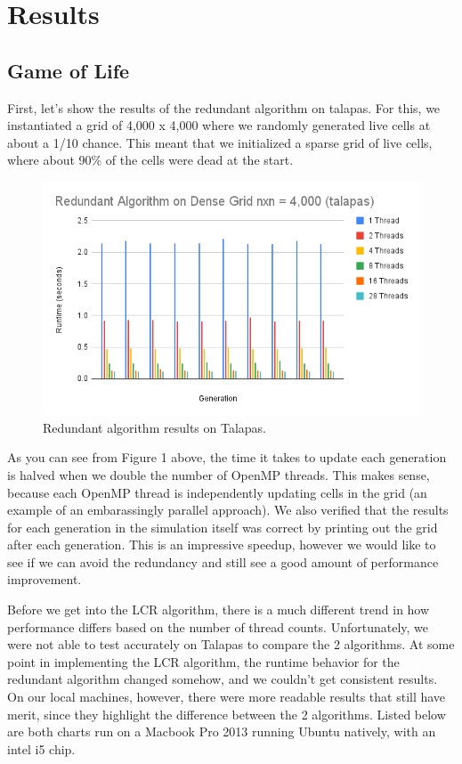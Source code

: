 \documentclass[12pt]{article}
\begin{document}
\section{Results}

\subsection{Game of Life}
First, let's show the results of the redundant algorithm on talapas. For this, we instantiated a grid of 4,000 x 4,000 where we randomly generated live cells at about a 1/10 chance. This meant that we initialized a sparse grid of live cells, where about 90\% of the cells were dead at the start.

\begin{figure}[ht]
\centering
\includegraphics[width=\linewidth]{redundant_4000.PNG}
\caption{\label{fig:chart_1}Redundant algorithm results on Talapas.}
\end{figure}

As you can see from Figure 1 above, the time it takes to update each generation is halved when we double the number of OpenMP threads. This makes sense, because each OpenMP thread is independently updating cells in the grid (an example of an embarassingly parallel approach). We also verified that the results for each generation in the simulation itself was correct by printing out the grid after each generation. This is an impressive speedup, however we would like to see if we can avoid the redundancy and still see a good amount of performance improvement.

Before we get into the LCR algorithm, there is a much different trend in how performance differs based on the number of thread counts. Unfortunately, we were not able to test accurately on Talapas to compare the 2 algorithms. At some point in implementing the LCR algorithm, the runtime behavior for the redundant algorithm changed somehow, and we couldn't get consistent results. On our local machines, however, there were more readable results that still have merit, since they highlight the difference between the 2 algorithms. Listed below are both charts run on a Macbook Pro 2013 running Ubuntu natively, with an intel i5 chip.
\end{document}
